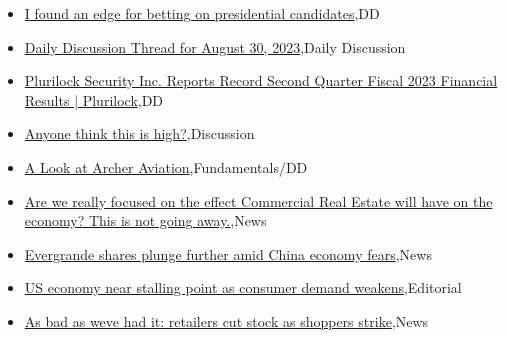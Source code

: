 \documentclass{article}%
\begin{document}
%
\begin{itemize}%
\item%
\href{https://reddit.com/r/wallstreetbets/comments/165dnb2/i\_found\_an\_edge\_for\_betting\_on\_presidential/}{I found an edge for betting on presidential candidates},DD%
\item%
\href{https://reddit.com/r/wallstreetbets/comments/165ag7r/daily\_discussion\_thread\_for\_august\_30\_2023/}{Daily Discussion Thread for August 30, 2023},Daily Discussion%
\item%
\href{https://reddit.com/r/Baystreetbets/comments/16567xn/plurilock\_security\_inc\_reports\_record\_second/}{Plurilock Security Inc. Reports Record Second Quarter Fiscal 2023 Financial Results | Plurilock},DD%
\item%
\href{https://reddit.com/r/StockMarket/comments/164yf81/anyone\_think\_this\_is\_high/}{Anyone think this is high?},Discussion%
\item%
\href{https://reddit.com/r/StockMarket/comments/164s1c4/a\_look\_at\_archer\_aviation/}{A Look at Archer Aviation},Fundamentals/DD%
\item%
\href{https://reddit.com/r/Economics/comments/1654od7/are\_we\_really\_focused\_on\_the\_effect\_commercial/}{Are we really focused on the effect Commercial Real Estate will have on the economy? This is not going away.},News%
\item%
\href{https://reddit.com/r/Economics/comments/164wddm/evergrande\_shares\_plunge\_further\_amid\_china/}{Evergrande shares plunge further amid China economy fears},News%
\item%
\href{https://reddit.com/r/Economics/comments/164vtuj/us\_economy\_near\_stalling\_point\_as\_consumer\_demand/}{US economy near stalling point as consumer demand weakens},Editorial%
\item%
\href{https://reddit.com/r/Economics/comments/164tr78/as\_bad\_as\_weve\_had\_it\_retailers\_cut\_stock\_as/}{As bad as weve had it: retailers cut stock as shoppers strike},News%
\end{itemize}%
\end{document}
